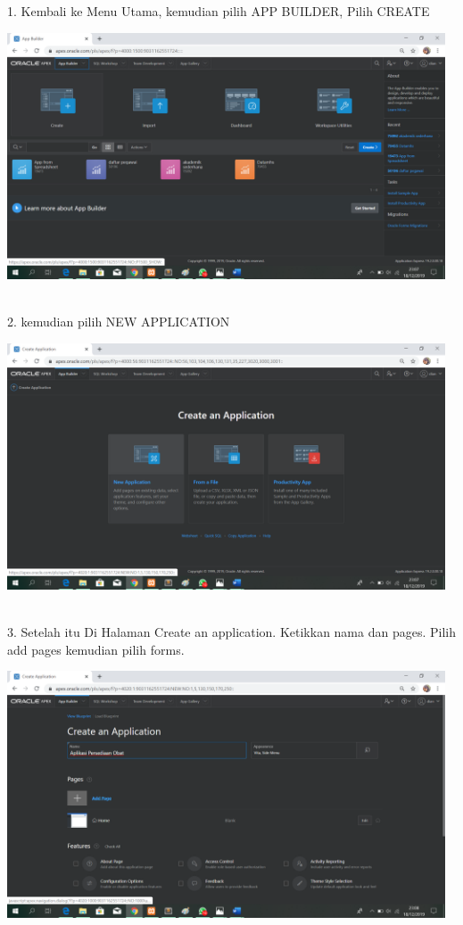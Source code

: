 \documentclass{article}
\begin{document}
1. Kembali ke Menu Utama, kemudian pilih APP BUILDER, Pilih CREATE
\begin{center}
    \includegraphics[width=13cm]{1.png}
\end{center}
\\
2. kemudian pilih NEW APPLICATION
\begin{center}
    \includegraphics[width=13cm]{figure/2.png}
\end{center}
\\
3. Setelah itu Di Halaman Create an application. Ketikkan nama dan pages. Pilih add pages kemudian pilih forms.
\begin{center}
    \includegraphics[width=13cm]{figure/3.png}
\end{center}
\end{document}
